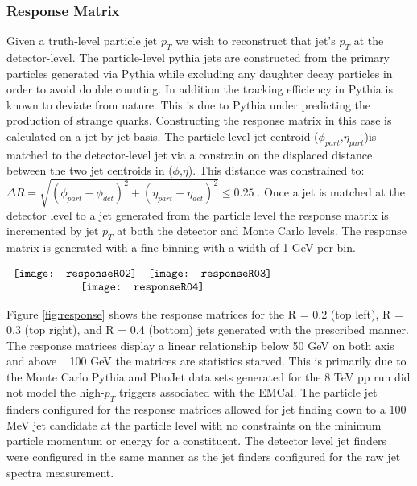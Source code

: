 \subsubsection{Response Matrix}
Given a truth-level particle jet $p_{T}$ we wish to reconstruct that jet's $p_{T}$ at the detector-level.  The particle-level pythia jets are constructed from the primary particles generated via Pythia while excluding any daughter decay particles in order to avoid double counting.  In addition the tracking efficiency in Pythia is known to deviate from nature.  This is due to Pythia under predicting the production of strange quarks.  
Constructing the response matrix in this case is calculated on a jet-by-jet basis.  The particle-level jet centroid ($\phi_{part}$,$\eta_{part}$)is matched to the detector-level jet via a constrain on the displaced distance between the two jet centroids in ($\phi$,$\eta$).  This distance was constrained to: $\Delta  R = \sqrt{(\phi_{part} - \phi_{det})^{2} + (\eta_{part} - \eta_{det})^{2}} \leq 0.25 \; $.  Once a jet is matched at the detector level to a jet generated from the particle level the response matrix is incremented by jet $p_{T}$ at both the detector and Monte Carlo levels.  The response matrix is generated with a fine binning with a width of 1 GeV per bin. 

\begin{figure*}[t!]
$\begin{array}{rl}
    \texttt{[image: responseR02]} &
    \texttt{[image: responseR03]}\\
    \multicolumn{2}{c}{\texttt{[image: responseR04]}}
\end{array}$
\caption[Response Matrices for R = 0.2, R=0.3, and R = 0.4 jets.]{\label{fig:response}Response Matrices for R = 0.2, R=0.3, and R = 0.4 jets.}
\end{figure*}

Figure \ref{fig:response} shows the response matrices for the R = 0.2 (top left), R = 0.3 (top right), and R = 0.4 (bottom) jets generated with the prescribed manner.  The response matrices display a linear relationship below 50 GeV on both axis and above ~ 100 GeV the matrices are statistics starved.  This is primarily due to the Monte Carlo Pythia and PhoJet data sets generated for the 8 TeV pp run did not model the high-$p_{T}$ triggers associated with the EMCal.  The particle jet finders configured for the response matrices allowed for jet finding down to a 100 MeV jet candidate at the particle level with no constraints on the minimum particle momentum or energy for a constituent.  The detector level jet finders were configured in the same manner as the jet finders configured for the raw jet spectra measurement.  

